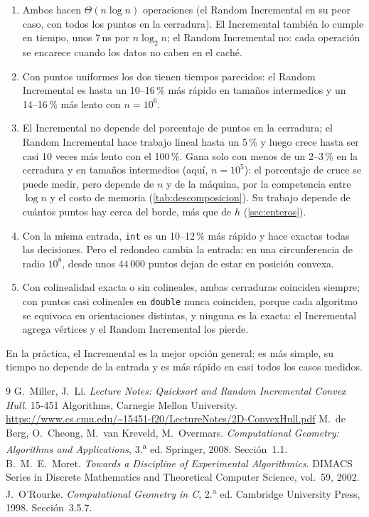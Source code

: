 \documentclass[11pt,letterpaper]{article}
\newcommand{\inc}{\textsf{Incremental}}
\newcommand{\ran}{\textsf{Random Incremental}}
\newcommand{\code}[1]{\texttt{#1}}
\begin{document}
\begin{enumerate}[label=\textbf{P\arabic*}]
  \item Ambos hacen $\Theta(n\log n)$ operaciones (el \ran{} en su peor caso,
        con todos los puntos en la cerradura). El \inc{} también lo cumple en
        tiempo, unos 7\,ns por $n\log_2 n$; el \ran{} no: cada operación se
        encarece cuando los datos no caben en el caché.
  \item Con puntos uniformes los dos tienen tiempos parecidos: el \ran{} es
        hasta un 10--16\,\% más rápido en tamaños intermedios y un
        14--16\,\% más lento con $n=10^6$.
  \item El \inc{} no depende del porcentaje de puntos en la cerradura; el \ran{}
        hace trabajo lineal hasta un 5\,\% y luego crece hasta ser casi 10 veces
        más lento con el 100\,\%. Gana solo con menos de un 2--3\,\% en la
        cerradura y en tamaños intermedios (aquí, $n=10^5$): el porcentaje de
        cruce se puede medir, pero depende de $n$ y de la máquina, por la
        competencia entre $\log n$ y el costo de memoria
        (\cref{tab:descomposicion}). Su trabajo depende de cuántos puntos hay
        cerca del borde, más que de $h$ (\cref{sec:enteros}).
  \item Con la misma entrada, \code{int} es un 10--12\,\% más rápido y hace
        exactas todas las decisiones. Pero el redondeo cambia la entrada: en
        una circunferencia de radio $10^8$, desde unos $44\,000$ puntos dejan
        de estar en posición convexa.
  \item Con colinealidad exacta o sin colineales, ambas cerraduras coinciden
        siempre; con puntos casi colineales en \code{double} nunca coinciden,
        porque cada algoritmo se equivoca en orientaciones distintas, y
        ninguna es la exacta: el \inc{} agrega vértices y el \ran{} los
        pierde.
\end{enumerate}

En la práctica, el \inc{} es la mejor opción general: es más simple, su tiempo
no depende de la entrada y es más rápido en casi todos los casos medidos.



\begin{thebibliography}{9}
 G.~Miller, J.~Li. \emph{Lecture Notes: Quicksort and Random
  Incremental Convex Hull}. 15-451 Algorithms, Carnegie Mellon University.
  \url{https://www.cs.cmu.edu/~15451-f20/LectureNotes/2D-ConvexHull.pdf}
 M.~de Berg, O.~Cheong, M.~van Kreveld, M.~Overmars.
  \emph{Computational Geometry: Algorithms and Applications}, 3.\textsuperscript{a}
  ed. Springer, 2008. Sección~1.1.
 B.~M.~E.~Moret. \emph{Towards a Discipline of Experimental
  Algorithmics}. DIMACS Series in Discrete Mathematics and Theoretical
  Computer Science, vol.~59, 2002.
 J.~O'Rourke. \emph{Computational Geometry in C},
  2.\textsuperscript{a} ed. Cambridge University Press, 1998. Sección~3.5.7.
\end{thebibliography}
\end{document}
